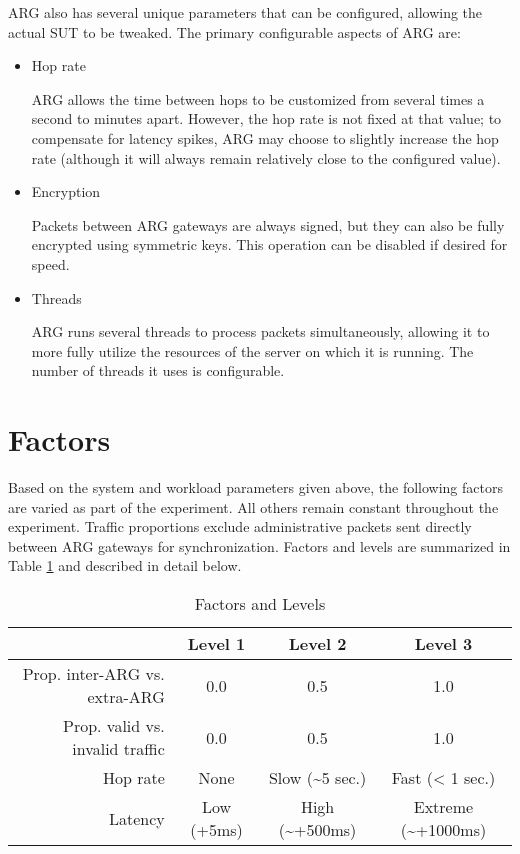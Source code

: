 \par \ac{ARG} also has several unique parameters that can be configured, allowing the actual \ac{SUT} to be tweaked. The primary configurable aspects of \ac{ARG} are:

\begin{itemize}
\item Hop rate
	\par \ac{ARG} allows the time between hops to be customized from several times a second to minutes apart. However, the hop rate is not fixed at that value; to compensate for latency spikes, \ac{ARG} may choose to slightly increase the hop rate (although it will always remain relatively close to the configured value).

\item Encryption
	\par Packets between \ac{ARG} gateways are always signed, but they can also be fully encrypted using symmetric keys. This operation can be disabled if desired for speed.

\item Threads
	\par \ac{ARG} runs several threads to process packets simultaneously, allowing it to more fully utilize the resources of the server on which it is running. The number of threads it uses is configurable.
\end{itemize}

\section{Factors}
\FloatBarrier
\label{sec:factors}
\par Based on the system and workload parameters given above, the following factors are varied as part of the experiment. All others remain constant throughout the experiment. Traffic proportions exclude administrative packets sent directly between \ac{ARG} gateways for synchronization. Factors and levels are summarized in Table \ref{tbl:factors} and described in detail below.


\begin{table}
\begin{center}
	\caption{Factors and Levels}
	\label{tbl:factors}
	
	\begin{tabular}{r|ccc}
		& Level 1 & Level 2 & Level 3 \\
	\hline
	Prop. inter-ARG vs. extra-ARG & 0.0 & 0.5 & 1.0 \\
	Prop. valid vs. invalid traffic & 0.0 & 0.5 & 1.0 \\
	Hop rate & None & Slow (\textasciitilde5 sec.) & Fast (< 1 sec.) \\
	Latency & Low (+5ms) & High (\textasciitilde+500ms) & Extreme (\textasciitilde+1000ms)
	\end{tabular}
\end{center}
\end{table}

